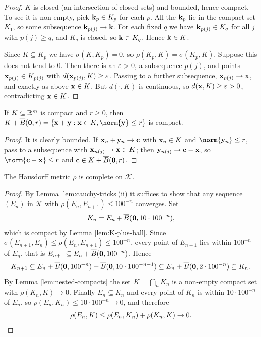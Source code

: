 \documentclass[a4paper]{scrartcl}
\newcommand{\KK}{\mathcal{K}}
\begin{document}
\begin{proof}
	$K$ is closed (an intersection of closed sets) and bounded, hence compact. To see it is non-empty, pick $\mathbf{k}_p\in K_p$ for each $p$. All the $\mathbf{k}_p$ lie in the compact set $K_1$, so some subsequence $\mathbf{k}_{p(j)}\to\mathbf{k}$. For each fixed $q$ we have $\mathbf{k}_{p(j)}\in K_q$ for all $j$ with $p(j)\geq q$, and $K_q$ is closed, so $\mathbf{k}\in K_q$. Hence $\mathbf{k}\in K$.

	Since $K\subseteq K_p$ we have $\sigma(K,K_p)=0$, so $\rho(K_p,K) = \sigma(K_p,K)$. Suppose this does not tend to $0$. Then there is an $\varepsilon>0$, a subsequence $p(j)$, and points $\mathbf{x}_{p(j)}\in K_{p(j)}$ with $d(\mathbf{x}_{p(j)},K)\geq\varepsilon$. Passing to a further subsequence, $\mathbf{x}_{p(j)}\to\mathbf{x}$, and exactly as above $\mathbf{x}\in K$. But $d(\cdot,K)$ is continuous, so $d(\mathbf{x},K)\geq\varepsilon>0$, contradicting $\mathbf{x}\in K$.
\end{proof}

\begin{lemma}\label{lem:K-plus-ball}
	If $K \subseteq\mathbb{R}^m$ is compact and $r \geq 0$, then $K+\overline{B}(\vv 0,r) = \{\vv x+\vv y : \vv x\in K, \norm{\vv y}\leq r\}$ is compact.
\end{lemma}

\begin{proof}
	It is clearly bounded. If $\mathbf{x}_n + \mathbf{y}_n\to\mathbf{c}$ with $\mathbf{x}_n\in K$ and $\norm{\vv y_n}\leq r$, pass to a subsequence with $\mathbf{x}_{n(j)}\to\mathbf{x}\in K$; then $\mathbf{y}_{n(j)}\to\mathbf{c}-\mathbf{x}$, so $\norm{\vv c-\vv x}\leq r$ and $\mathbf{c}\in K+\overline{B}(\mathbf{0},r)$.
\end{proof}

\begin{theorem}\label{thm:hausdorff-complete}
	The Hausdorff metric $\rho$ is complete on $\KK$.
\end{theorem}

\begin{proof}
	By Lemma \ref{lem:cauchy-tricks}(ii) it suffices to show that any sequence $(E_n)$ in $\KK$ with $\rho(E_n,E_{n+1})\leq 100^{-n}$ converges. Set
	$$K_n = E_n + \overline{B}(\mathbf{0}, 10\cdot 100^{-n}),$$
	which is compact by Lemma \ref{lem:K-plus-ball}. Since $\sigma(E_{n+1},E_n)\leq\rho(E_n,E_{n+1})\leq100^{-n}$, every point of $E_{n+1}$ lies within $100^{-n}$ of $E_n$, that is $E_{n+1}\subseteq E_n + \overline B(\mathbf{0},100^{-n})$. Hence
	$$K_{n+1} \subseteq E_n + \overline B(\mathbf{0}, 100^{-n}) + \overline B(\mathbf{0}, 10\cdot 100^{-n-1}) \subseteq E_n + \overline B(\mathbf{0}, 2\cdot 100^{-n}) \subseteq K_n.$$
	By Lemma \ref{lem:nested-compacts} the set $K = \bigcap_n K_n$ is a non-empty compact set with $\rho(K_n,K)\to0$. Finally $E_n\subseteq K_n$ and every point of $K_n$ is within $10\cdot100^{-n}$ of $E_n$, so $\rho(E_n,K_n)\leq10\cdot100^{-n}\to0$, and therefore
	$$\rho(E_n,K)\leq\rho(E_n,K_n)+\rho(K_n,K)\to0. \qedhere$$
\end{proof}
\end{document}
